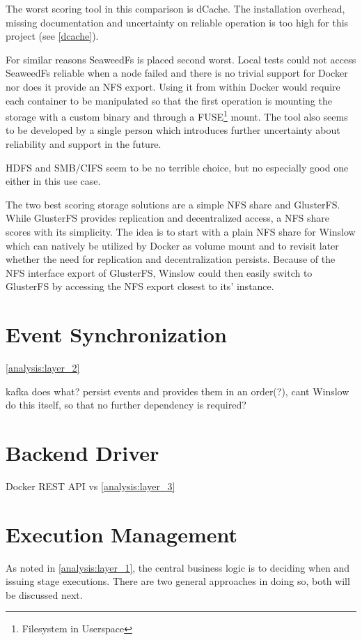 The worst scoring tool in this comparison is dCache.
The installation overhead, missing documentation and uncertainty on reliable operation is too high for this project (see \autoref{dcache}).

For similar reasons SeaweedFs is placed second worst.
Local tests could not access SeaweedFs reliable when a node failed and there is no trivial support for Docker nor does it provide an NFS export.
Using it from within Docker would require each container to be manipulated so that the first operation is mounting the storage with a custom binary and through a FUSE\footnote{Filesystem in Userspace} mount.
The tool also seems to be developed by a single person which introduces further uncertainty about reliability and support in the future.

HDFS and SMB/CIFS seem to be no terrible choice, but no especially good one either in this use case.

The two best scoring storage solutions are a simple NFS share and GlusterFS.
While GlusterFS provides replication and decentralized access, a NFS share scores with its simplicity.
The idea is to start with a plain NFS share for Winslow which can natively be utilized by Docker as volume mount and to revisit later whether the need for replication and decentralization persists.
Because of the NFS interface export of GlusterFS, Winslow could then easily switch to GlusterFS by accessing the NFS export closest to its' instance.

\section{Event Synchronization}
\autoref{analysis:layer_2}


kafka does what? persist events and provides them in an order(?), cant Winslow do this itself, so that no further dependency is required?

\section{Backend Driver}

Docker REST API vs 
 \autoref{analysis:layer_3}


\section{Execution Management}

As noted in \autoref{analysis:layer_1}, the central business logic is to deciding when and issuing stage executions.
There are two general approaches in doing so, both will be discussed next.

